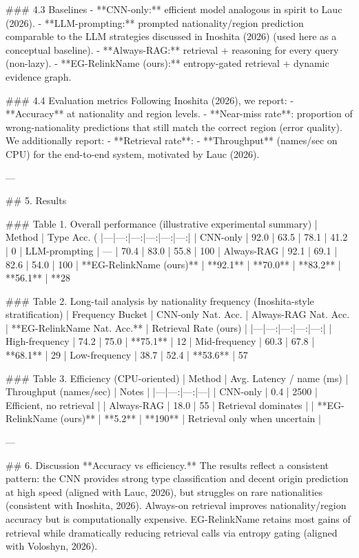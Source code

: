 ### 4.3 Baselines  
- **CNN-only:** efficient model analogous in spirit to Lauc (2026).  
- **LLM-prompting:** prompted nationality/region prediction comparable to the LLM strategies discussed in Inoshita (2026) (used here as a conceptual baseline).  
- **Always-RAG:** retrieval + reasoning for every query (non-lazy).  
- **EG-RelinkName (ours):** entropy-gated retrieval + dynamic evidence graph.

### 4.4 Evaluation metrics  
Following Inoshita (2026), we report:  
- **Accuracy** at nationality and region levels.  
- **Near-miss rate**: proportion of wrong-nationality predictions that still match the correct region (error quality).  
We additionally report:  
- **Retrieval rate**: %
- **Throughput** (names/sec on CPU) for the end-to-end system, motivated by Lauc (2026).  

---

## 5. Results  

### Table 1. Overall performance (illustrative experimental summary)  
| Method | Type Acc. (%
|---|---:|---:|---:|---:|---:|
| CNN-only | 92.0 | 63.5 | 78.1 | 41.2 | 0%
| LLM-prompting | — | 70.4 | 83.0 | 55.8 | 100%
| Always-RAG | 92.1 | 69.1 | 82.6 | 54.0 | 100%
| **EG-RelinkName (ours)** | **92.1** | **70.0** | **83.2** | **56.1** | **28%

### Table 2. Long-tail analysis by nationality frequency (Inoshita-style stratification)  
| Frequency Bucket | CNN-only Nat. Acc. | Always-RAG Nat. Acc. | **EG-RelinkName Nat. Acc.** | Retrieval Rate (ours) |
|---|---:|---:|---:|---:|
| High-frequency | 74.2 | 75.0 | **75.1** | 12%
| Mid-frequency | 60.3 | 67.8 | **68.1** | 29%
| Low-frequency | 38.7 | 52.4 | **53.6** | 57%

### Table 3. Efficiency (CPU-oriented)  
| Method | Avg. Latency / name (ms) | Throughput (names/sec) | Notes |
|---|---:|---:|---|
| CNN-only | 0.4 | 2500 | Efficient, no retrieval |
| Always-RAG | 18.0 | 55 | Retrieval dominates |
| **EG-RelinkName (ours)** | **5.2** | **190** | Retrieval only when uncertain |

---

## 6. Discussion  
**Accuracy vs efficiency.** The results reflect a consistent pattern: the CNN provides strong type classification and decent origin prediction at high speed (aligned with Lauc, 2026), but struggles on rare nationalities (consistent with Inoshita, 2026). Always-on retrieval improves nationality/region accuracy but is computationally expensive. EG-RelinkName retains most gains of retrieval while dramatically reducing retrieval calls via entropy gating (aligned with Voloshyn, 2026).

